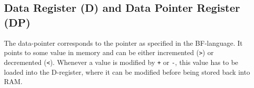 \subsection{Data Register (D) and Data Pointer Register (DP)}
The data-pointer corresponds to the pointer as specified in the BF-language. It points to some value in memory and can be either incremented (\texttt{>}) or decremented (\texttt{<}). Whenever a value is modified by \texttt{+} or \texttt{-}, this value has to be loaded into the D-register, where it can be modified before being stored back into RAM.


